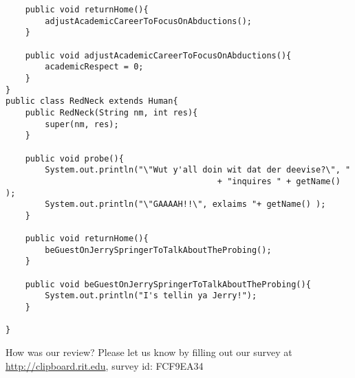 \documentclass[11pt]{article}
\newenvironment{answer}{\large\lstset{basicstyle=\large}\color{white}}{}
\newenvironment{answer}{\large\lstset{basicstyle=\large}\color{red}}{}
\begin{document}
\begin{enumerate}
\begin{answer}
\begin{lstlisting}
    public void returnHome(){
        adjustAcademicCareerToFocusOnAbductions();
    }

    public void adjustAcademicCareerToFocusOnAbductions(){
        academicRespect = 0;
    }
}
public class RedNeck extends Human{
    public RedNeck(String nm, int res){
        super(nm, res);
    }

    public void probe(){
        System.out.println("\"Wut y'all doin wit dat der deevise?\", "
                                           + "inquires " + getName() );
        System.out.println("\"GAAAAH!!\", exlaims "+ getName() );
    }

    public void returnHome(){
        beGuestOnJerrySpringerToTalkAboutTheProbing();
    }

    public void beGuestOnJerrySpringerToTalkAboutTheProbing(){
        System.out.println("I's tellin ya Jerry!");
    }

}

\end{lstlisting}
\end{answer}
\end{enumerate}



\vfill
\begin{framed}
How was our review? Please let us know by filling out our survey at\\
\url{http://clipboard.rit.edu}, survey id: FCF9EA34
\end{framed}
\end{document}
